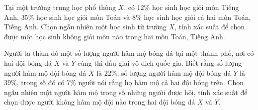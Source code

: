 \begin{ex}%
	Tại một trường trung học phổ thông $X$, có $12\%$ học sinh học giỏi môn Tiếng Anh, $35\%$ học sinh  học giỏi môn Toán và $8\%$ học sinh học giỏi cả hai môn Toán, Tiếng Anh. Chọn ngẫu nhiên một học sinh từ trường $X$, tính xác suất để chọn được một học sinh không giỏi môn nào trong hai môn Toán, Tiếng Anh.
\end{ex}

\begin{ex}%
	Người ta thăm dò một số lượng người hâm mộ bóng đá tại một thành phố, nơi có hai đội bóng đá $X$ và $Y$ cùng thi đấu giải vô địch quốc gia. Biết rằng số lượng người hâm mộ đội bóng đá $X$ là $22\%$, số lượng người hâm mộ đội bóng đá $Y$ là $39\%$, trong số đó có $7\%$ người nói rằng họ  hâm mộ cả hai đội bóng trên. Chọn ngẫu nhiên một người hâm mộ trong số những người được hỏi, tính xác suất để chọn được người không hâm mộ đội nào trong hai đội bóng đá $X$ và $Y$.
\end{ex}

